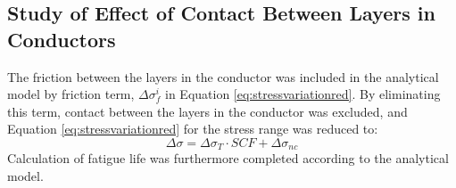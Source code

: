 \subsection{Study of Effect of Contact Between Layers in Conductors}
The friction between the layers in the conductor was included in the analytical model by friction term, $\Delta \sigma_f^i$ in Equation \ref{eq:stressvariationred}. By eliminating this term, contact between the layers in the conductor was excluded, and  Equation \ref{eq:stressvariationred} for the stress range was reduced to:
\begin{equation}
    \Delta \sigma=\Delta \sigma_T \cdot SCF + \Delta \sigma_{nc}
\end{equation}
Calculation of fatigue life was furthermore completed according to the analytical model.




